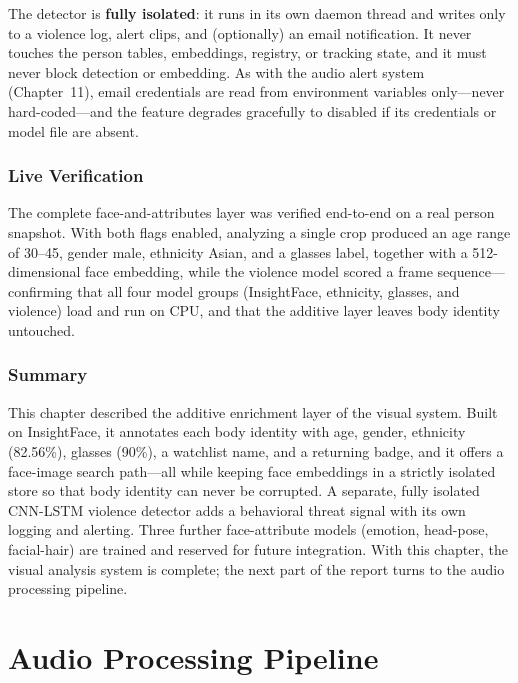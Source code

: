 \documentclass[12pt]{report}
\begin{document}
The detector is \textbf{fully isolated}: it runs in its own daemon thread and writes only to a violence log, alert clips, and (optionally) an email notification. It never touches the person tables, embeddings, registry, or tracking state, and it must never block detection or embedding. As with the audio alert system (Chapter~11), email credentials are read from environment variables only---never hard-coded---and the feature degrades gracefully to disabled if its credentials or model file are absent.

\section{Live Verification}
The complete face-and-attributes layer was verified end-to-end on a real person snapshot. With both flags enabled, analyzing a single crop produced an age range of 30--45, gender male, ethnicity Asian, and a glasses label, together with a 512-dimensional face embedding, while the violence model scored a frame sequence---confirming that all four model groups (InsightFace, ethnicity, glasses, and violence) load and run on CPU, and that the additive layer leaves body identity untouched.

\section{Summary}
This chapter described the additive enrichment layer of the visual system. Built on InsightFace, it annotates each body identity with age, gender, ethnicity (82.56\%), glasses (90\%), a watchlist name, and a returning badge, and it offers a face-image search path---all while keeping face embeddings in a strictly isolated store so that body identity can never be corrupted. A separate, fully isolated CNN-LSTM violence detector adds a behavioral threat signal with its own logging and alerting. Three further face-attribute models (emotion, head-pose, facial-hair) are trained and reserved for future integration. With this chapter, the visual analysis system is complete; the next part of the report turns to the audio processing pipeline.

\newpage

\part{Audio Processing Pipeline}
\end{document}
